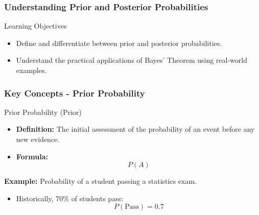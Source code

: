 \documentclass[aspectratio=169]{beamer}
\begin{document}
\begin{frame}[fragile]
    \frametitle{Understanding Prior and Posterior Probabilities}
    \begin{block}{Learning Objectives}
        \begin{itemize}
            \item Define and differentiate between prior and posterior probabilities.
            \item Understand the practical applications of Bayes' Theorem using real-world examples.
        \end{itemize}
    \end{block}
\end{frame}

\begin{frame}[fragile]
    \frametitle{Key Concepts - Prior Probability}
    \begin{block}{Prior Probability (Prior)}
        \begin{itemize}
            \item \textbf{Definition:} The initial assessment of the probability of an event before any new evidence.
            \item \textbf{Formula:} 
            \[
            P(A)
            \]
        \end{itemize}
    \end{block}
    \begin{example}
        \textbf{Example:} Probability of a student passing a statistics exam.
        \begin{itemize}
            \item Historically, 70\% of students pass:
            \[
            P(\text{Pass}) = 0.7
            \]
        \end{itemize}
    \end{example}
\end{frame}
\end{document}
